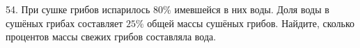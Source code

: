 54. При сушке грибов испарилось $80\%$ имевшейся в них воды. Доля воды в сушёных грибах составляет $25\%$ общей массы сушёных грибов. Найдите, сколько процентов массы свежих грибов составляла вода.\\
